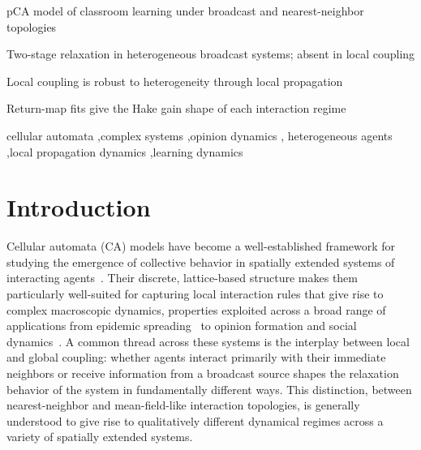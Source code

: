 \documentclass[a4paper,fleqn]{cas-sc}
\begin{document}
\begin{highlights}
\item pCA model of classroom learning under broadcast and nearest-neighbor topologies
\item Two-stage relaxation in heterogeneous broadcast systems; absent in local coupling
\item Local coupling is robust to heterogeneity through local propagation
\item Return-map fits give the Hake gain shape of each interaction regime
\end{highlights}

\begin{keywords}
cellular automata \sep complex systems \sep opinion dynamics \sep 
heterogeneous agents \sep local propagation dynamics \sep learning dynamics
\end{keywords}

\maketitle

\section{Introduction}\label{sec:intro}

Cellular automata (CA) models have become a well-established framework for studying the emergence of collective behavior in spatially extended systems of interacting agents~\citep{kari2005catheory, zaitsev2017generalized, louis2018probabilistic, Batac2009, arciaga2009experimental}.
Their discrete, lattice-based structure makes them particularly well-suited for capturing local interaction rules that give rise to complex macroscopic dynamics, properties exploited across a broad range of applications from epidemic spreading~\citep{Beauchemin2005} to opinion formation and social dynamics~\citep{castellano2009statistical}.
A common thread across these systems is the interplay between local and global coupling: whether agents interact primarily with their immediate neighbors or receive information from a broadcast source shapes the relaxation behavior of the system in fundamentally different ways.
This distinction, between nearest-neighbor and mean-field-like interaction topologies, is generally understood to give rise to qualitatively different dynamical regimes across a variety of spatially extended systems.
\end{document}
